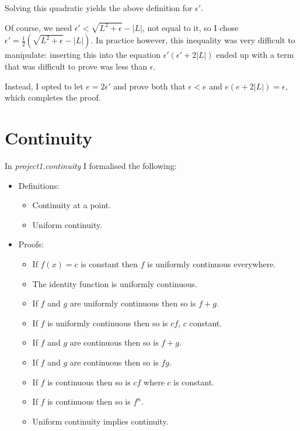 \documentclass[a4paper, twoside, 11pt]{article}
\theoremstyle{definition}
\theoremstyle{plain}
\theoremstyle{remark}
\begin{document}
Solving this quadratic yields the above definition for $\epsilon'$.

Of course, we need $\epsilon' < \sqrt{L^{2} + \epsilon} - \left\lvert L \right\rvert$, not equal to it, so I chose $\epsilon' = \frac{1}{2}\left( \sqrt{L^{2} + \epsilon} - \left\lvert L \right\rvert \right)$. In practice however, this inequality was very difficult to manipulate: inserting this into the equation $\epsilon'(\epsilon' + 2|L|)$ ended up with a term that was difficult to prove was less than $\epsilon$.

Instead, I opted to let $e = 2\epsilon'$ and prove both that $\epsilon < e$ and $e(e + 2|L|) = \epsilon$, which completes the proof.


\section{Continuity}

In \emph{project1.continuity} I formalised the following:
\begin{itemize}
    \item Definitions:
    \begin{itemize}
        \item Continuity at a point.
        \item Uniform continuity.
    \end{itemize}
    \item Proofs:
    \begin{itemize}
        \item If $f(x) = c$ is constant then $f$ is uniformly continuous everywhere.
        \item The identity function is uniformly continuous.
        \item If $f$ and $g$ are uniformly continuous then so is $f + g$.
        \item If $f$ is uniformly continuous then so is $cf$, $c$ constant.
        \item If $f$ and $g$ are continuous then so is $f + g$.
        \item If $f$ and $g$ are continuous then so is $fg$.
        \item If $f$ is continuous then so is $cf$ where $c$ is constant.
        \item If $f$ is continuous then so is $f^{n}$.
        \item Uniform continuity implies continuity.
    \end{itemize}
\end{itemize}
\end{document}
